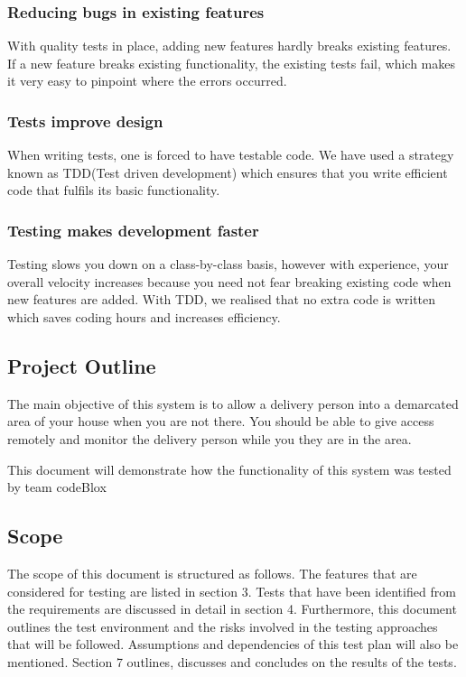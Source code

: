 \documentclass[a4paper,12pt]{article}
\begin{document}
			\subsubsection{Reducing bugs in existing features}
			With quality tests in place, adding new features hardly breaks existing features. If a new feature breaks existing functionality, the existing tests fail, which makes it very easy to pinpoint where the errors occurred.
			
			\subsubsection{Tests improve design}
			When writing tests, one is forced to have testable code. We have used a strategy known as TDD(Test driven development) which ensures that you write efficient code that fulfils its basic functionality.
			
			\subsubsection{Testing makes development faster}
			Testing slows you down on a class-by-class basis, however with experience, your overall velocity increases because you need not fear breaking existing code when new features are added. With TDD, we realised that no extra code is written which saves coding hours and increases efficiency.  
			
		\subsection{Project Outline}
		The main objective of this system is to allow a delivery person into a demarcated area of your house when you are not there. You should be able to give access remotely and monitor the delivery person while you they are in the area.
		
		This document will demonstrate how the functionality of this system was tested by team codeBlox
		
		\subsection{Scope}
		The scope of this document is structured as follows. The features that are considered for testing are listed in section 3. Tests that have been identified from the requirements are discussed in detail in section 4. Furthermore, this document outlines the test environment and the risks involved in the testing approaches that will be followed. Assumptions and dependencies of this test plan will also be mentioned. Section 7 outlines, discusses and concludes on the results of the tests.
		
\end{document}
